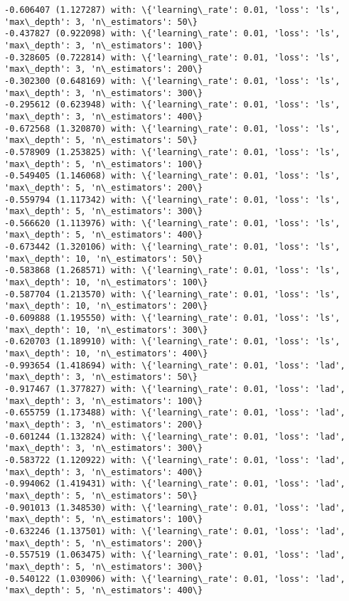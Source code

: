\documentclass[11pt]{article}
\begin{document}
\begin{Verbatim}[commandchars=\\\{\}]
-0.606407 (1.127287) with: \{'learning\_rate': 0.01, 'loss': 'ls', 'max\_depth': 3, 'n\_estimators': 50\}
-0.437827 (0.922098) with: \{'learning\_rate': 0.01, 'loss': 'ls', 'max\_depth': 3, 'n\_estimators': 100\}
-0.328605 (0.722814) with: \{'learning\_rate': 0.01, 'loss': 'ls', 'max\_depth': 3, 'n\_estimators': 200\}
-0.302300 (0.648169) with: \{'learning\_rate': 0.01, 'loss': 'ls', 'max\_depth': 3, 'n\_estimators': 300\}
-0.295612 (0.623948) with: \{'learning\_rate': 0.01, 'loss': 'ls', 'max\_depth': 3, 'n\_estimators': 400\}
-0.672568 (1.320870) with: \{'learning\_rate': 0.01, 'loss': 'ls', 'max\_depth': 5, 'n\_estimators': 50\}
-0.578909 (1.253825) with: \{'learning\_rate': 0.01, 'loss': 'ls', 'max\_depth': 5, 'n\_estimators': 100\}
-0.549405 (1.146068) with: \{'learning\_rate': 0.01, 'loss': 'ls', 'max\_depth': 5, 'n\_estimators': 200\}
-0.559794 (1.117342) with: \{'learning\_rate': 0.01, 'loss': 'ls', 'max\_depth': 5, 'n\_estimators': 300\}
-0.566620 (1.113976) with: \{'learning\_rate': 0.01, 'loss': 'ls', 'max\_depth': 5, 'n\_estimators': 400\}
-0.673442 (1.320106) with: \{'learning\_rate': 0.01, 'loss': 'ls', 'max\_depth': 10, 'n\_estimators': 50\}
-0.583868 (1.268571) with: \{'learning\_rate': 0.01, 'loss': 'ls', 'max\_depth': 10, 'n\_estimators': 100\}
-0.587704 (1.213570) with: \{'learning\_rate': 0.01, 'loss': 'ls', 'max\_depth': 10, 'n\_estimators': 200\}
-0.609888 (1.195550) with: \{'learning\_rate': 0.01, 'loss': 'ls', 'max\_depth': 10, 'n\_estimators': 300\}
-0.620703 (1.189910) with: \{'learning\_rate': 0.01, 'loss': 'ls', 'max\_depth': 10, 'n\_estimators': 400\}
-0.993654 (1.418694) with: \{'learning\_rate': 0.01, 'loss': 'lad', 'max\_depth': 3, 'n\_estimators': 50\}
-0.917467 (1.377827) with: \{'learning\_rate': 0.01, 'loss': 'lad', 'max\_depth': 3, 'n\_estimators': 100\}
-0.655759 (1.173488) with: \{'learning\_rate': 0.01, 'loss': 'lad', 'max\_depth': 3, 'n\_estimators': 200\}
-0.601244 (1.132824) with: \{'learning\_rate': 0.01, 'loss': 'lad', 'max\_depth': 3, 'n\_estimators': 300\}
-0.583722 (1.120922) with: \{'learning\_rate': 0.01, 'loss': 'lad', 'max\_depth': 3, 'n\_estimators': 400\}
-0.994062 (1.419431) with: \{'learning\_rate': 0.01, 'loss': 'lad', 'max\_depth': 5, 'n\_estimators': 50\}
-0.901013 (1.348530) with: \{'learning\_rate': 0.01, 'loss': 'lad', 'max\_depth': 5, 'n\_estimators': 100\}
-0.632246 (1.137501) with: \{'learning\_rate': 0.01, 'loss': 'lad', 'max\_depth': 5, 'n\_estimators': 200\}
-0.557519 (1.063475) with: \{'learning\_rate': 0.01, 'loss': 'lad', 'max\_depth': 5, 'n\_estimators': 300\}
-0.540122 (1.030906) with: \{'learning\_rate': 0.01, 'loss': 'lad', 'max\_depth': 5, 'n\_estimators': 400\}

\end{Verbatim}
\end{document}
